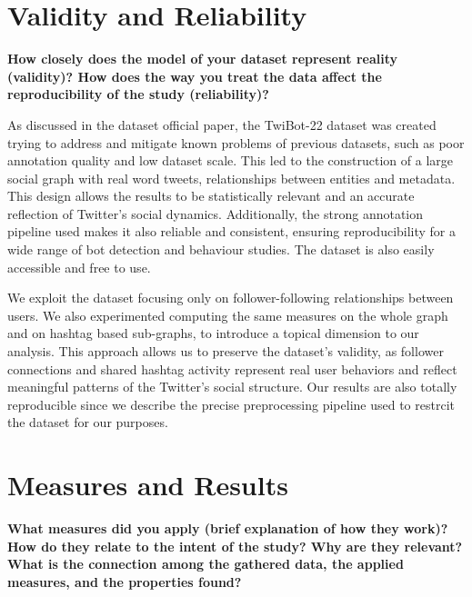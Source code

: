 \documentclass[12pt, a4paper]{article}
\begin{document}
\section{Validity and Reliability}
	\label{validity-and-reliability-not-needed-for-the-project-proposal}

	\textbf{How closely does the model of your dataset represent reality (validity)? How does the way you treat the data affect the reproducibility of the study (reliability)?}

   As discussed in the dataset official paper, the TwiBot-22 dataset was created trying to address and mitigate known problems of previous datasets, such as poor annotation quality and low dataset scale. This led to the construction of a large social graph with real word tweets, relationships between entities and metadata. This design allows the results to be statistically relevant and an accurate reflection of Twitter’s social dynamics. Additionally, the strong annotation pipeline used makes it also reliable and consistent, ensuring reproducibility for a wide range of bot detection and behaviour studies. The dataset is also easily accessible and free to use.

    We exploit the dataset focusing only on follower-following relationships between users. We also experimented computing the same measures on the whole graph and on hashtag based sub-graphs, to introduce a topical dimension to our analysis. This approach allows us to preserve the dataset’s validity, as follower connections and shared hashtag activity represent real user behaviors and reflect meaningful patterns of the Twitter’s social structure. Our results are also totally reproducible since we describe the precise preprocessing pipeline used to restrcit the dataset for our purposes.

    


\section{Measures and Results}
	\label{measures}

	\textbf{What measures did you apply (brief explanation of how they work)? How do they relate to the intent of the study? Why are they relevant? What is the connection among the gathered data, the applied measures, and the properties found?}\\
	
	
\end{document}
